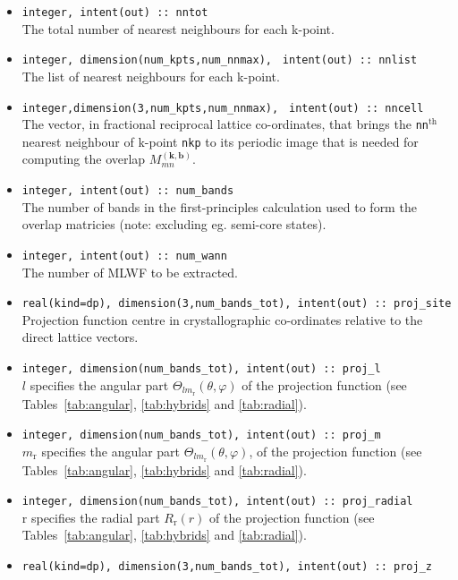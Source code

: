 \begin{itemize}
\item \verb#integer, intent(out) :: nntot#\\ The
  total number of nearest neighbours for each k-point. 
\item \verb#integer, dimension(num_kpts,num_nnmax),#
      \verb# intent(out) :: nnlist#\\
      The list of nearest neighbours for each k-point.
\item \verb#integer,dimension(3,num_kpts,num_nnmax),#
      \verb# intent(out) :: nncell#\\ 
      The vector, in fractional reciprocal lattice co-ordinates, that
      brings the \verb#nn#$^{\mathrm{th}}$ nearest neighbour of
      k-point \verb#nkp# to its periodic image that
      is needed for computing the overlap 
      $M_{mn}^{(\mathbf{k,b})}$.
\item \verb#integer, intent(out) :: num_bands#\\ The number of bands in the
first-principles calculation used to form the overlap matricies (note: excluding eg. semi-core states).
\item \verb#integer, intent(out) :: num_wann#\\ The number of MLWF
  to be extracted.
\item  \verb#real(kind=dp), dimension(3,num_bands_tot), intent(out) :: proj_site# \\
Projection function centre
in crystallographic co-ordinates relative to the direct lattice
vectors.
\item \verb#integer, dimension(num_bands_tot), intent(out) :: proj_l#\\
 $l$  specifies the angular part $\Theta_{lm_{\mathrm{r}}}(\theta,\varphi)$ of the
projection function  (see Tables~\ref{tab:angular}, \ref{tab:hybrids}
and \ref{tab:radial}). 
\item \verb#integer, dimension(num_bands_tot), intent(out) :: proj_m#\\
 $m_\mathrm{r}$ specifies the angular part $\Theta_{lm_{\mathrm{r}}}(\theta,\varphi)$, of the
projection function
 (see Tables~\ref{tab:angular}, \ref{tab:hybrids}
and \ref{tab:radial}). 
\item \verb#integer, dimension(num_bands_tot), intent(out) :: proj_radial#\\
$\mathrm{r}$ specifies the radial part $R_{\mathrm{r}}(r)$ of the
projection function 
(see Tables~\ref{tab:angular}, \ref{tab:hybrids}
and \ref{tab:radial}). 
\item  \verb#real(kind=dp), dimension(3,num_bands_tot), intent(out) :: proj_z#\\

\end{itemize}
